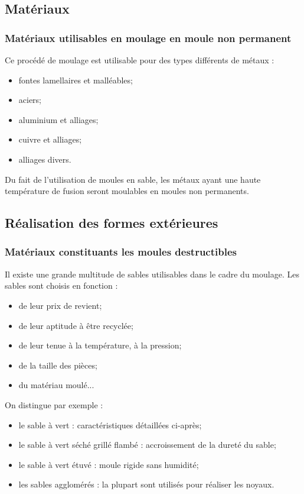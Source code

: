 \documentclass[11pt,oneside]{article}
\begin{document}
\subsection{Matériaux}
\subsubsection{Matériaux utilisables en moulage en moule non permanent}
Ce procédé de moulage est utilisable pour des types différents de métaux :
\begin{itemize}
 \item fontes lamellaires et malléables;
\item aciers; 
\item aluminium et alliages;
\item cuivre et alliages;  
\item alliages divers.
\end{itemize}


Du fait de l'utilisation de moules en sable, les métaux ayant une haute
température de fusion seront moulables en moules non permanents.



\subsection{Réalisation des formes extérieures}

\subsubsection{Matériaux constituants les moules destructibles}
Il existe une grande multitude de sables utilisables dans le cadre du moulage. 
Les sables sont choisis en fonction :
\begin{itemize}
 \item de leur prix de revient;
 \item de leur aptitude à être recyclée;
 \item de leur tenue à la température, à la pression;
 \item de la taille des pièces;
 \item du matériau moulé...
\end{itemize}

On distingue par exemple : 
\begin{itemize}
 \item le sable à vert : caractéristiques détaillées ci-après;
\item le sable à vert séché grillé flambé : accroissement de la dureté du sable;
\item le sable à vert étuvé : moule rigide sans humidité;
\item les sables agglomérés : la plupart sont utilisés pour réaliser les noyaux. 
\end{itemize}
\end{document}
